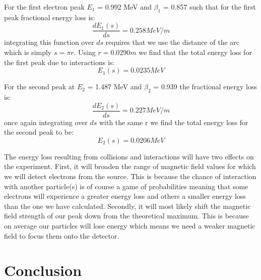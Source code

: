 For the first electron peak $E_1$ = 0.992 MeV and $\beta_1$ = 0.857 such that for the first peak fractional  energy loss is:
\begin{equation}
\frac{dE_1(s)}{ds} = 0.258 MeV/m
\end{equation}
integrating this function over $ds$ requires that we use the distance of the arc which is simply $s=\pi r$. Using $r = 0.0290 m$ we find that the total energy loss for the first peak due to interactions is:
\begin{equation}
E_1(s) = 0.0235 MeV
\end{equation} 

For the second peak at $E_2$ = 1.487 MeV and $\beta_2$ = 0.939 the fractional energy loss is:
\begin{equation}
\frac{dE_2(s)}{ds} = 0.227 MeV/m
\end{equation}
once again integrating over $ds$ with the same r we find the total energy loss for the second peak to be:
\begin{equation}
E_2 (s)= 0.0206 MeV
\end{equation}

The energy loss resulting from collisions and interactions will have two effects on the experiment.  First, it will broaden the range of magnetic field values for which we will detect electrons from the source. This is because the chance of interaction with another particle(s) is of course a game of probabilities meaning that some electrons will experience a greater energy loss and others a smaller energy loss than the one we have calculated.  Secondly, it will most likely shift the magnetic field strength of our peak down from the theoretical maximum.  This is because on average our particles will lose energy which means we need a weaker magnetic field to focus them onto the detector.  
  


\section{Conclusion}
